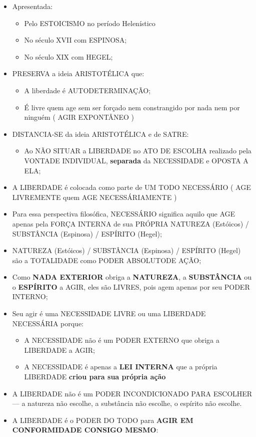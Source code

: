 \documentclass[
]{book}
\providecommand{\tightlist}{%
  \setlength{\itemsep}{0pt}\setlength{\parskip}{0pt}}
\begin{document}
\begin{itemize}
\tightlist
\item
  Apresentada:

  \begin{itemize}
  \tightlist
  \item
    Pelo ESTOICISMO no período Helenístico
  \item
    No século XVII com ESPINOSA;
  \item
    No século XIX com HEGEL;
  \end{itemize}
\item
  PRESERVA a ideia ARISTOTÉLICA que:

  \begin{itemize}
  \tightlist
  \item
    A liberdade é AUTODETERMINAÇÃO;
  \item
    É livre quem age sem ser forçado nem constrangido por nada nem por
    ninguém ( AGIR EXPONTÂNEO )
  \end{itemize}
\item
  DISTANCIA-SE da ideia ARISTOTÉLICA e de SATRE:

  \begin{itemize}
  \tightlist
  \item
    Ao NÃO SITUAR a LIBERDADE no ATO DE ESCOLHA realizado pela VONTADE
    INDIVIDUAL, \textbf{separada} da NECESSIDADE e OPOSTA A ELA;
  \end{itemize}
\item
  A LIBERDADE é colocada como parte de UM TODO NECESSÁRIO ( AGE
  LIVREMENTE quem AGE NECESSÁRIAMENTE )
\item
  Para essa perspectiva filosófica, NECESSÁRIO significa aquilo que AGE
  apenas pela FORÇA INTERNA de sua PRÓPRIA NATUREZA (Estóicos) /
  SUBSTÂNCIA (Espinosa) / ESPÍRITO (Hegel);
\item
  NATUREZA (Estóicos) / SUBSTÂNCIA (Espinosa) / ESPÍRITO (Hegel) são a
  TOTALIDADE como PODER ABSOLUTODE AÇÃO;
\item
  Como \textbf{NADA EXTERIOR} obriga a \textbf{NATUREZA}, a
  \textbf{SUBSTÂNCIA} ou o \textbf{ESPÍRITO} a AGIR, eles são LIVRES,
  pois agem apenas por seu PODER INTERNO;
\item
  Seu agir é uma NECESSIDADE LIVRE ou uma LIBERDADE NECESSÁRIA porque:

  \begin{itemize}
  \tightlist
  \item
    A NECESSIDADE não é um PODER EXTERNO que obriga a LIBERDADE a AGIR;
  \item
    A NECESSIDADE é apenas a \textbf{LEI INTERNA} que a própria
    LIBERDADE \textbf{criou para sua própria ação}
  \end{itemize}
\item
  A LIBERDADE não é um PODER INCONDICIONADO PARA ESCOLHER --- a natureza
  não escolhe, a substância não escolhe, o espírito não escolhe.
\item
  A LIBERDADE é o PODER DO TODO para \textbf{AGIR EM CONFORMIDADE
  CONSIGO MESMO}:


\end{itemize}
\end{document}
